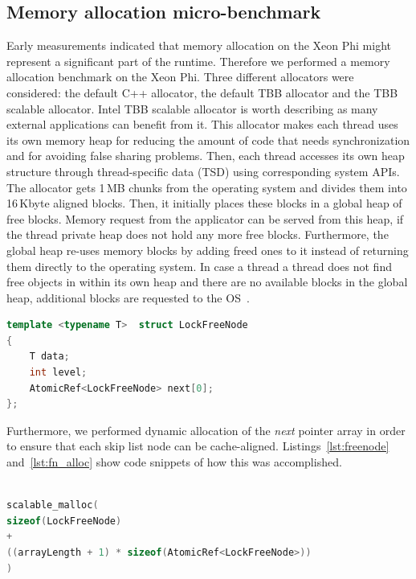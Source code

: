 \subsection{Memory allocation micro-benchmark}
Early measurements indicated that memory allocation on the Xeon Phi might represent a significant part of the runtime. Therefore we performed a memory allocation benchmark on the Xeon Phi. Three different allocators were considered: the default C++ allocator, the default TBB allocator and the TBB scalable allocator. 
Intel TBB scalable allocator is worth describing as many external applications can benefit from it. This allocator makes each thread uses its own memory heap for reducing the amount of code that needs synchronization and for avoiding false sharing problems. Then, each thread accesses its own heap structure through thread-specific data (TSD) using corresponding system APIs. The allocator gets 1\,MB chunks from the operating system and divides them into 16\,Kbyte aligned blocks. Then, it initially places these blocks in a global heap of free blocks. Memory request from the applicator can be served from this heap, if the thread private heap does not hold any more free blocks. Furthermore, the global heap re-uses memory blocks by adding freed ones to it instead of returning them directly to the operating system. In case a thread a thread does not find free objects in within its own heap and there are no available blocks in the global heap, additional blocks are requested to the OS~\cite{_thefoundations,Hudson:2006:MST:1133956.1133967}. %

\begin{lstlisting}[language=C++,basicstyle=\tt\scriptsize,captionpos=b,caption=Lock free node structure,label=lst:freenode,morekeywords={*, size_t}]
template <typename T>  struct LockFreeNode
{	
	T data;
	int	level;
	AtomicRef<LockFreeNode>	next[0];
};
\end{lstlisting}

Furthermore, we performed dynamic allocation of the {\em next} pointer array in order to ensure that each skip list node can be cache-aligned. Listings~\ref{lst:freenode} and~\ref{lst:fn_alloc} show code snippets of how this was accomplished.
\begin{lstlisting}[language=C++,basicstyle=\tt\scriptsize,captionpos=b,caption=Memory allocation instruction for array of atomic references,label=lst:fn_alloc, morekeywords={*, size_t}]

scalable_malloc(
sizeof(LockFreeNode) 
+ 
((arrayLength + 1) * sizeof(AtomicRef<LockFreeNode>))
)
\end{lstlisting}

